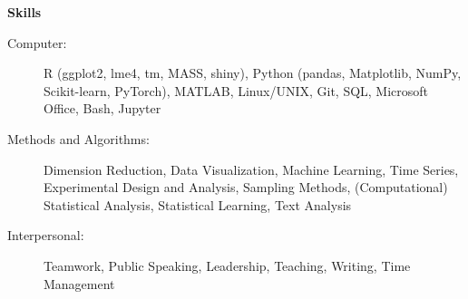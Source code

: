 \documentclass[letterpaper,10pt]{article}
\newcommand{\resheading}[1]{\colorbox{resBlue}{\begin{minipage}{\textwidth}
			\textbf{#1}
\end{minipage}} \vspace{-14pt}}
\begin{document}
\resheading{Skills}
\vspace{-2pt}
\begin{description}
	\item[Computer:] 
	{\footnotesize R (ggplot2, lme4, tm, MASS, shiny), Python (pandas, Matplotlib, NumPy, Scikit-learn, PyTorch), MATLAB, Linux/UNIX, Git, SQL, Microsoft Office, Bash, Jupyter} \vspace{-4pt}
	\item[Methods and Algorithms:] 
	{\footnotesize Dimension Reduction, Data Visualization, Machine Learning, Time Series, Experimental Design and Analysis, Sampling Methods, (Computational) Statistical Analysis, Statistical Learning, Text Analysis}  \vspace{-4pt}
	\begin{comment}{\footnotesize Regression (Logistic, GAM, Mixed Models), PCA, Factor Analysis, LDA, SVM, Simulated Annealing, MCMC, Boosting, Random Forests, SARIMA, GARCH, Graphical Models, Dimension Reduction, Model Regularization, Visualization, Experimental Design, Sampling Theory, Statistical Process Analysis, KNN, EM Algorithm, Text Processing} \end{comment}
	\item[Interpersonal:] 
	{\footnotesize Teamwork, Public Speaking, Leadership, Teaching, Writing, Time Management}
\vspace{-4pt}
\end{description}
\end{document}
